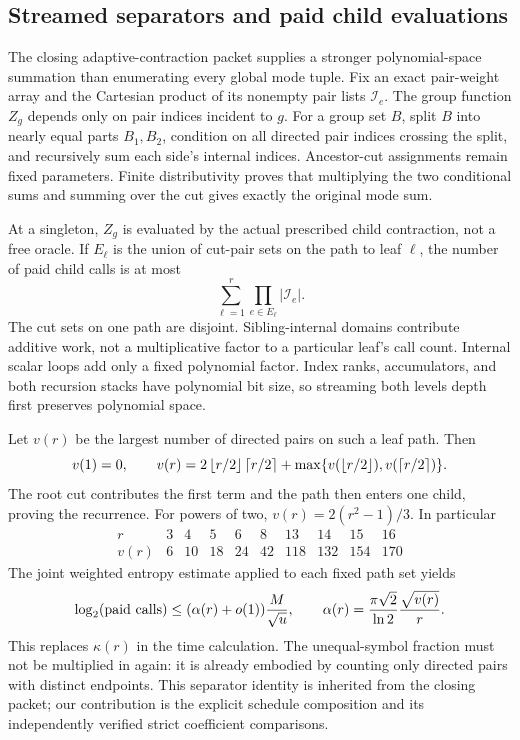 \documentclass[11pt,letterpaper]{article}
\theoremstyle{remark}\newtheorem{remark}[theorem]{Remark}
\begin{document}
\subsection{Streamed separators and paid child evaluations}
The closing adaptive-contraction packet supplies a stronger polynomial-space
summation than enumerating every global mode tuple. Fix an exact pair-weight
array and the Cartesian product of its nonempty pair lists $\mathcal I_e$.
The group function $Z_g$ depends only on pair indices incident to $g$.
For a group set $B$, split $B$ into nearly equal parts $B_1,B_2$, condition on
all directed pair indices crossing the split, and recursively sum each side's
internal indices. Ancestor-cut assignments remain fixed parameters.
Finite distributivity proves that multiplying the two conditional sums and
summing over the cut gives exactly the original mode sum.

At a singleton, $Z_g$ is evaluated by the actual prescribed child contraction,
not a free oracle. If $E_\ell$ is the union of cut-pair sets on the path to
leaf $\ell$, the number of paid child calls is at most
\begin{equation}\label{eq:stream-calls}
 \sum_{\ell=1}^r\prod_{e\in E_\ell}|\mathcal I_e|.
\end{equation}
The cut sets on one path are disjoint. Sibling-internal domains contribute
additive work, not a multiplicative factor to a particular leaf's call count.
Internal scalar loops add only a fixed polynomial factor. Index ranks,
accumulators, and both recursion stacks have polynomial bit size, so
streaming both levels depth first preserves polynomial space.

Let $v(r)$ be the largest number of directed pairs on such a leaf path. Then
\begin{equation}\label{eq:path-profile}
 v(1)=0,\qquad
 v(r)=2\left\lfloor r/2\right\rfloor\left\lceil r/2\right\rceil
 +\max\{v(\left\lfloor r/2\right\rfloor),v(\left\lceil r/2\right\rceil)\}.
\end{equation}
The root cut contributes the first term and the path then enters one child,
proving the recurrence. For powers of two, $v(r)=2(r^2-1)/3$. In particular
\[
\begin{array}{c|rrrrrrrrr}
r&3&4&5&6&8&13&14&15&16\\\hline
v(r)&6&10&18&24&42&118&132&154&170
\end{array}
\]
The joint weighted entropy estimate applied to each fixed path set yields
\begin{equation}\label{eq:stream-local}
 \log_2(\hbox{paid calls})\le(\alpha(r)+o(1))\frac M{\sqrt u},
 \qquad \alpha(r)=\frac{\pi\sqrt2}{\ln2}\frac{\sqrt{v(r)}}r.
\end{equation}
This replaces $\kappa(r)$ in the time calculation. The unequal-symbol
fraction must not be multiplied in again: it is already embodied by counting
only directed pairs with distinct endpoints. This separator identity is
inherited from the closing packet; our contribution is the explicit schedule
composition and its independently verified strict coefficient comparisons.
\end{document}
